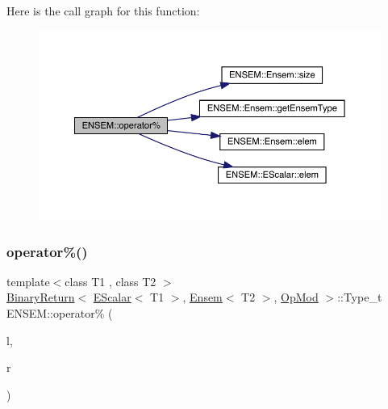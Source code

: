 Here is the call graph for this function\+:\nopagebreak
\begin{figure}[H]
\begin{center}
\leavevmode
\includegraphics[width=350pt]{d1/d9e/group__eensem_gac6f1dfc7f3ac04dea5a10016a1cf8994_cgraph}
\end{center}
\end{figure}
\mbox{\label{group__eensem_ga00d0a959bef6d8cd4aa976de1482281d}} 
\subsubsection{\texorpdfstring{operator\%()}{operator\%()}\hspace{0.1cm}{\footnotesize\ttfamily [3/3]}}
{\footnotesize\ttfamily template$<$class T1 , class T2 $>$ \\
\mbox{\hyperlink{structENSEM_1_1BinaryReturn}{Binary\+Return}}$<$ \mbox{\hyperlink{classENSEM_1_1EScalar}{E\+Scalar}}$<$ T1 $>$, \mbox{\hyperlink{classENSEM_1_1Ensem}{Ensem}}$<$ T2 $>$, \mbox{\hyperlink{structENSEM_1_1OpMod}{Op\+Mod}} $>$\+::Type\+\_\+t E\+N\+S\+E\+M\+::operator\% (\begin{DoxyParamCaption}\item[{const \mbox{\hyperlink{classENSEM_1_1EScalar}{E\+Scalar}}$<$ T1 $>$ \&}]{l,  }\item[{const \mbox{\hyperlink{classENSEM_1_1Ensem}{Ensem}}$<$ T2 $>$ \&}]{r }\end{DoxyParamCaption})\hspace{0.3cm}{\ttfamily [inline]}}

